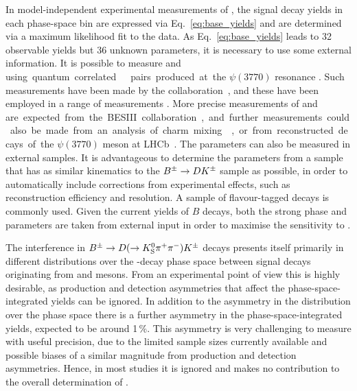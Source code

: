 
In model-independent experimental measurements of \g, the signal decay yields in each phase-space bin are expressed via Eq.~\eqref{eq:base_yields} and \xy are determined via a maximum likelihood fit to the data. As Eq.~\eqref{eq:base_yields} leads to 32 observable yields but 36 unknown parameters, it is necessary to use some external information. It is possible to measure \ci and \si using quantum correlated \Dz\Dzb pairs produced at the $\psi(3770)$ resonance \cite{BPMODIND1,BPMODIND2}. Such measurements have been made by the \cleo collaboration~\cite{CLEOCISI}, and these have been employed in a range of \g measurements \cite{BELLEMODIND,LHCb-PAPER-2014-041,LHCb-PAPER-2016-006,LHCb-PAPER-2018-017}. More precise measurements of \ci and \si are expected from the BESIII collaboration, and further measurements could also be made from an analysis of charm mixing \cite{Thomas:2012qf}, or from reconstructed decays of the $\psi(3770)$ meson at LHCb~\cite{Aaij:2019evc}. The \Ki parameters can also be measured in external samples. It is advantageous to determine the \Ki parameters from a sample that has as similar kinematics to the ${{B}^\pm}\rightarrow{\ensuremath{D}}{\ensuremath{{K}^\pm}}$ sample as possible, in order to automatically include corrections from experimental effects, such as reconstruction efficiency and resolution. A sample of flavour-tagged \D decays is commonly used. Given the current yields of $B$ decays, both the strong phase and \Ki parameters are taken from external input in order to maximise the sensitivity to \xy.     


The interference in ${{B}^\pm}\rightarrow{\ensuremath{D}}(\rightarrow{\ensuremath{{K}^0_{\mathrm{S}}}}\pi^+ \pi^-){{K}^\pm}$ decays presents itself primarily in different distributions over the \D-decay phase space between signal decays originating from \Bp and \Bm mesons. From an experimental point of view this is highly desirable, as production and detection asymmetries that affect the phase-space-integrated yields can be ignored. In addition to the asymmetry in the distribution over the phase space there is a further \CP asymmetry in the phase-space-integrated yields, expected to be around 1\,\%. This \CP asymmetry is very challenging to measure with useful precision, due to the limited sample sizes currently available and possible biases of a similar magnitude from production and detection asymmetries. Hence, in most studies it is ignored and makes no contribution to the overall determination of \g. 


